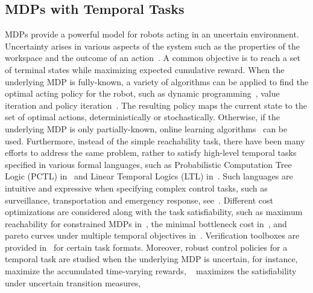 \subsection{MDPs with Temporal Tasks}\label{subsec:mdp-ltl}
MDPs provide a powerful model for robots acting in an uncertain environment.
Uncertainty arises in various aspects of the system such as the properties of the workspace and the outcome of an action~\cite{puterman2014markov}.
A common objective is to reach a set of terminal states while maximizing {expected cumulative reward}.
When the underlying MDP is fully-known,
a variety of algorithms can be applied to find the optimal acting policy for the robot,
such as dynamic programming~\cite{bellman1966dynamic, bertsekas1995neuro}, value iteration and policy iteration~\cite{puterman2014markov}.
The resulting policy maps the current state to the set of optimal actions,
deterministically or stochastically.
Otherwise, if the underlying MDP is only partially-known,
{online learning algorithms~\cite{sutton2018reinforcement} can be used.}
Furthermore, instead of the simple reachability task,
there have been many efforts to address the same problem,
rather to satisfy high-level temporal tasks specified in various formal languages,
such as Probabilistic Computation Tree Logic (PCTL) in~\cite{lahijanian2015formal}
and Linear Temporal Logics (LTL) in~\cite{guo2018probabilistic, belta2017formal, ding2014optimal,  forejt2011quantitative}.
Such languages are intuitive and expressive when specifying complex control tasks,
such as surveillance, transportation and emergency response, see~\cite{guo2015multi, tumova2016multi, kantaros2018control, schillinger2018simultaneous}.
{Different cost optimizations are considered along with the task satisfiability,
such as maximum reachability for constrained MDPs in~\cite{ding2014optimal,forejt2011quantitative},
  the minimal bottleneck cost in~\cite{smith2011optimal},
  and pareto curves under multiple temporal objectives in~\cite{Forejt12Pareto}.}
Verification toolboxes are provided in~\cite{etessami2007multi, kwiatkowska2011prism} for certain task formats.
Moreover, robust control policies for a temporal task are studied when the underlying MDP is uncertain,
for instance,~\cite{ding2014ltl} maximize the accumulated time-varying rewards, ~\cite{wolff2012robust} maximizes the satisfiability under uncertain transition measures,
